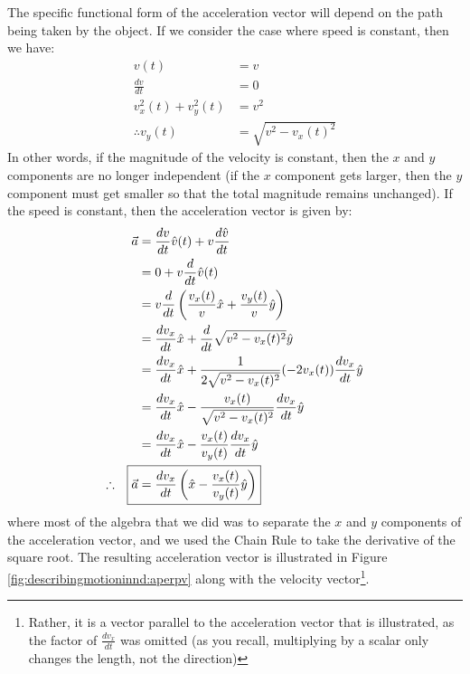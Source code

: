 The specific functional form of the acceleration vector will depend on the path being taken by the object. If we consider the case where speed is constant, then we have:
\begin{align*}
v(t) &= v \\
\frac{dv}{dt}&=0\\
v_x^2(t)+v_y^2(t) &=v^2 \\
\therefore v_y(t)&=\sqrt{v^2-v_x(t)^2}
\end{align*}
In other words, if the magnitude of the velocity is constant, then the $x$ and $y$ components are no longer independent (if the $x$ component gets larger, then the $y$ component must get smaller so that the total magnitude remains unchanged). If the speed is constant, then the acceleration vector is given by:
\begin{align}
\label{eqn:describingmotioninnd:vecaconstv}
\vec a&=\frac{dv}{dt}\hat v(t)+v\frac{d\hat v}{dt}\nonumber\\
&=0 + v\frac{d}{dt}\hat v(t)\nonumber\\
&=v\frac{d}{dt}\left(\frac{v_x(t)}{v}\hat x+\frac{v_y(t)}{v}\hat y  \right)\nonumber\\
&=\frac{dv_x}{dt}\hat x + \frac{d}{dt}\sqrt{v^2-v_x(t)^2}\hat y\nonumber\\
&=\frac{dv_x}{dt}\hat x + \frac{1}{2\sqrt{v^2-v_x(t)^2}}(-2v_x(t))\frac{dv_x}{dt}\hat y\nonumber\\
&=\frac{dv_x}{dt}\hat x - \frac{v_x(t)}{\sqrt{v^2-v_x(t)^2}}\frac{dv_x}{dt}\hat y\nonumber\\
&=\frac{dv_x}{dt}\hat x - \frac{v_x(t)}{v_y(t)}\frac{dv_x}{dt}\hat y\nonumber\\
\therefore\quad\Aboxed{\vec a&=\frac{dv_x}{dt} \left(\hat x - \frac{v_x(t)}{v_y(t)}\hat y\right)}
\end{align}
where most of the algebra that we did was to separate the $x$ and $y$ components of the acceleration vector, and we used the Chain Rule to take the derivative of the square root. The resulting acceleration vector is illustrated in Figure \ref{fig:describingmotioninnd:aperpv} along with the velocity vector\footnote{Rather, it is a vector parallel to the acceleration vector that is illustrated, as the factor of $\frac{dv_x}{dt}$ was omitted (as you recall, multiplying by a scalar only changes the length, not the direction)}.
